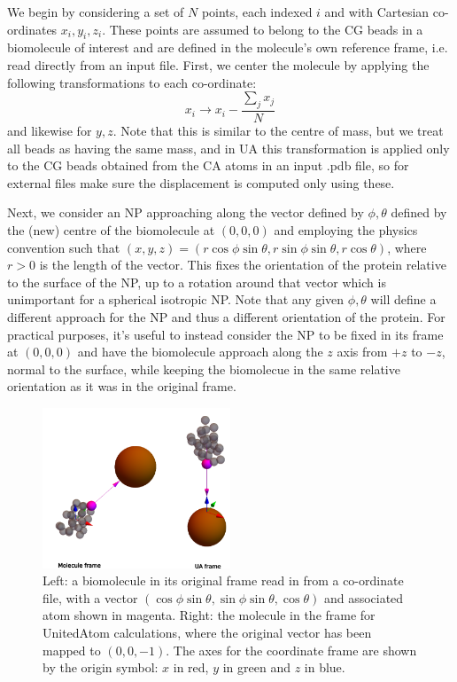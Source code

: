 \documentclass[10pt,a4paper,onecolumn]{report}
\begin{document}
We begin by considering a set of $N$ points, each indexed $i$ and with Cartesian co-ordinates $x_i,y_i,z_i$. These points are assumed to belong to the CG beads in a biomolecule of interest and are defined in the molecule's own reference frame, i.e. read directly from an input file. First, we center the molecule by applying the following transformations to each co-ordinate:
\begin{equation}
x_i \rightarrow x_i - \frac{\sum_j x_j }{N}
\end{equation}
and likewise for $y,z$. Note that this is similar to the centre of mass, but we treat all beads as having the same mass, and in UA this transformation is applied only to the CG beads obtained from the CA atoms in an input .pdb file, so for external files make sure the displacement is computed only using these.

Next, we consider an NP approaching along the vector defined by $\phi,\theta$ defined by the (new) centre of the biomolecule at $(0,0,0)$ and employing the physics convention such that $(x,y,z) = (r \cos \phi \sin \theta, r \sin \phi \sin \theta, r \cos \theta)$, where $r > 0$ is the length of the vector. This fixes the orientation of the protein relative to the surface of the NP, up to a rotation around that vector which is unimportant for a spherical isotropic NP. Note that any given $\phi,\theta$ will define a different approach for the NP and thus a different orientation of the protein.  For practical purposes, it's useful to instead consider the NP to be fixed in its frame at $(0,0,0)$ and have the biomolecule approach along the $z$ axis from $+z$ to $-z$, normal to the surface, while keeping the biomolecue in the same relative orientation as it was in the original frame. 

\begin{figure} \label{fig:rotation_frames}
    \centering
    \includegraphics[width=0.5\textwidth]{figures/rotation_frames.png}
    \caption{Left: a biomolecule in its original frame read in from a co-ordinate file, with a vector $(\cos \phi \sin \theta, \sin \phi \sin \theta, \cos \theta)$ and associated atom shown in magenta. Right: the molecule in the frame for UnitedAtom calculations, where the original vector has been mapped to $(0,0,-1)$. The axes for the coordinate frame are shown by the origin symbol: $x$ in red, $y$ in green and $z$ in blue. }
\end{figure}
\end{document}
